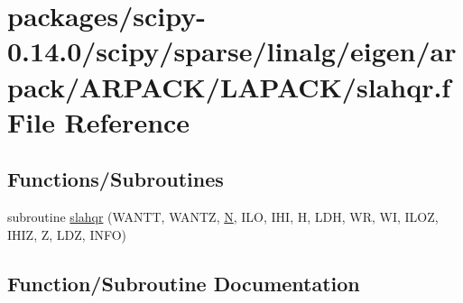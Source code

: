 \hypertarget{scipy-0_814_80_2scipy_2sparse_2linalg_2eigen_2arpack_2ARPACK_2LAPACK_2slahqr_8f}{}\section{packages/scipy-\/0.14.0/scipy/sparse/linalg/eigen/arpack/\+A\+R\+P\+A\+C\+K/\+L\+A\+P\+A\+C\+K/slahqr.f File Reference}
\label{scipy-0_814_80_2scipy_2sparse_2linalg_2eigen_2arpack_2ARPACK_2LAPACK_2slahqr_8f}
\subsection*{Functions/\+Subroutines}
\begin{DoxyCompactItemize}
\item 
subroutine \hyperlink{scipy-0_814_80_2scipy_2sparse_2linalg_2eigen_2arpack_2ARPACK_2LAPACK_2slahqr_8f_ae54e59a2d967d6ea7c589e7211ff0dc5}{slahqr} (W\+A\+N\+T\+T, W\+A\+N\+T\+Z, \hyperlink{polmisc_8c_a0240ac851181b84ac374872dc5434ee4}{N}, I\+L\+O, I\+H\+I, H, L\+D\+H, W\+R, W\+I, I\+L\+O\+Z, I\+H\+I\+Z, Z, L\+D\+Z, I\+N\+F\+O)
\end{DoxyCompactItemize}


\subsection{Function/\+Subroutine Documentation}
\hypertarget{scipy-0_814_80_2scipy_2sparse_2linalg_2eigen_2arpack_2ARPACK_2LAPACK_2slahqr_8f_ae54e59a2d967d6ea7c589e7211ff0dc5}{}
